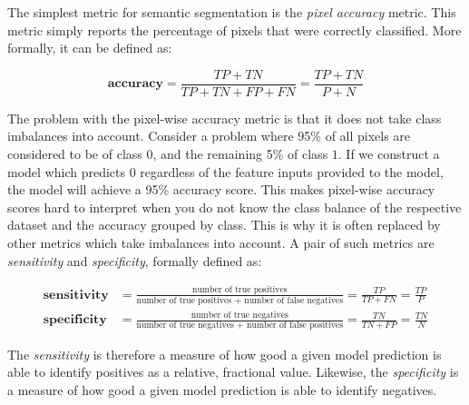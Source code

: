The simplest metric for semantic segmentation is the \textit{pixel accuracy} metric.
This metric simply reports the percentage of pixels that were correctly classified.
More formally, it can be defined as:

\begin{equation*}
    \textbf{accuracy} = \frac{TP + TN}{TP + TN + FP + FN} = \frac{TP + TN}{P + N}
\end{equation*}

The problem with the pixel-wise accuracy metric is that it does not take class imbalances into account.
Consider a problem where 95\% of all pixels are considered to be of class $0$, and the remaining 5\% of class $1$.
If we construct a model which predicts $0$ regardless of the feature inputs provided to the model, the model will achieve a 95\% accuracy score.
This makes pixel-wise accuracy scores hard to interpret when you do not know the class balance of the respective dataset and the accuracy grouped by class.
This is why it is often replaced by other metrics which take imbalances into account.
A pair of such metrics are \textit{sensitivity} and \textit{specificity}, formally defined as:

\begin{small}
\begin{align*}
    \textbf{sensitivity}
    &=
    \frac{\text{number of true positives}}{\text{number of true positives + number of false negatives}}
    =
    \frac{TP}{TP + FN}
    =
    \frac{TP}{P}
    \\
    \textbf{specificity}
    &=
    \frac{\text{number of true negatives}}{\text{number of true negatives + number of false positives}}
    =
    \frac{TN}{TN + FP}
    =
    \frac{TN}{N}
\end{align*}
\end{small}

The \textit{sensitivity} is therefore a measure of how good a given model prediction is able to identify positives as a relative, fractional value.
Likewise, the \textit{specificity} is a measure of how good a given model prediction is able to identify negatives.
